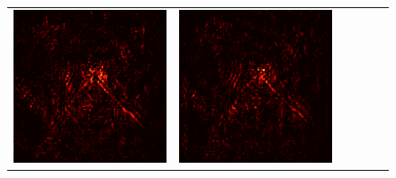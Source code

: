 \documentclass[preprint,12pt]{elsarticle}
\begin{document}
\begin{figure}[p]
\begin{tabular}{cccccc}
  \includegraphics[scale=\scale]{../visualizations/examples/imagenette/resnet18/active_saliency_map/7.png} & 
  \includegraphics[scale=\scale]{../visualizations/examples/imagenette/resnet18/inactive_saliency_map/7.png} \\
  

\end{tabular}
\end{figure}
\end{document}
